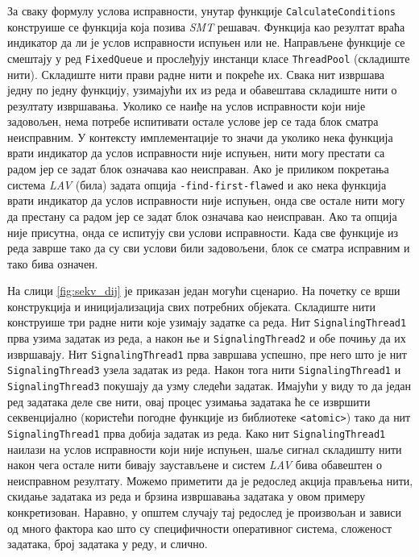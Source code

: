 \documentclass[12pt,oneside]{memoir}
\begin{document}
 За сваку формулу услова исправности, унутар функције \texttt{CalculateConditions} конструише се функција која позива \textit{SMT} решавач. Функција као резултат враћа индикатор да ли је услов исправности испуњен или не. Направљене функције се смештају у ред \texttt{FixedQueue} и прослеђују инстанци класе \texttt{ThreadPool} (складиште нити). Складиште нити прави радне нити и покреће их. Свака нит извршава једну по једну функцију, узимајући их из реда и обавештава складиште нити о резултату извршавања. Уколико се наиђе на услов исправности који није задовољен, нема потребе испитивати остале услове јер се тада блок сматра неисправним. У контексту имплементације то значи да уколико нека функција врати индикатор да услов исправности није испуњен, нити могу престати са радом јер се задат блок означава као неисправан. Ако је приликом покретања система \textit{LAV} (била) задата опција \texttt{-find-first-flawed} и ако нека функција врати индикатор да услов исправности није испуњен, онда све остале нити могу да престану са радом јер се задат блок означава као неисправан. Ако та опција није присутна, онда се испитују сви услови исправности. Када све функције из реда заврше тако да су сви услови били задовољени, блок се сматра исправним и тако бива означен. 
 
 На слици \ref{fig:sekv_dij}  је приказан један могући сценарио. На почетку се врши конструкција и иницијализација свих потребних објеката. Складиште нити конструише три радне нити које узимају задатке са реда. Нит \texttt{SignalingThread1} прва узима задатак из реда, а након ње и \texttt{SignalingThread2} и обе почињу да их извршавају. Нит \texttt{SignalingThread1} прва завршава успешно, пре него што је нит \texttt{SignalingThread3} узела задатак из реда. Након тога нити  \texttt{SignalingThread1} и  \texttt{SignalingThread3} покушају да узму следећи задатак. Имајући у виду то да један ред задатака деле све нити, овај процес узимања задатака ће се извршити секвенцијално (користећи погодне функције из библиотеке  \texttt{<atomic>}) тако да нит \texttt{SignalingThread1} прва добија задатак из реда. Како нит  \texttt{SignalingThread1} наилази на услов исправности који није испуњен, шаље сигнал складишту нити након чега остале нити бивају заустављене и систем \textit{LAV} бива обавештен о неисправном резултату. Можемо приметити да је редослед акција прављења нити, скидање задатака из реда и брзина извршавања задатака у овом примеру конкретизован. Наравно, у општем случају тај редослед је произвољан и зависи од много фактора као што су специфичности оперативног система, сложеност задатака, број задатака у реду, и слично.  
\end{document}
